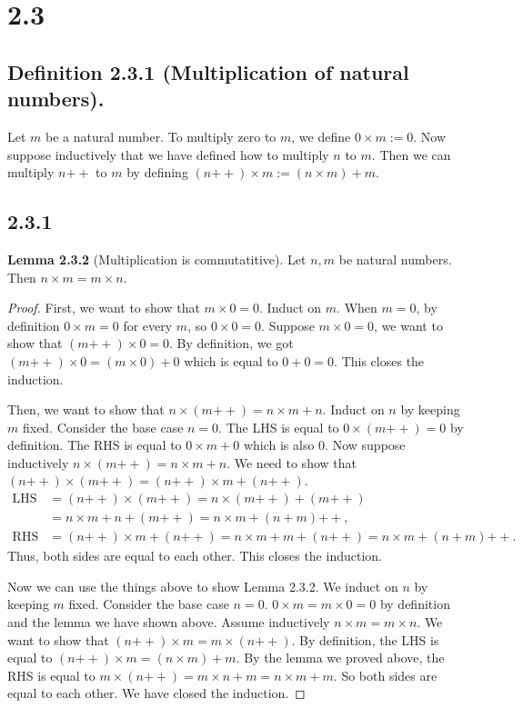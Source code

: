\documentclass[12pt, letter]{article}
\begin{document}
\section*{2.3}
\subsection*{Definition 2.3.1 (Multiplication of natural numbers).}
Let $m$ be a natural number. To multiply zero to $m$, we define $0\times m:=0$. Now suppose inductively that we have defined how to multiply $n$ to $m$. Then we can multiply $n\mathtt{++}$ to $m$ by defining $(n\mathtt{++})\times m:=(n\times m)+m$.
\subsection*{2.3.1}
\textbf{Lemma 2.3.2} (Multiplication is commutatitive). Let $n,m$ be natural numbers. Then $n\times m=m\times n$.
\begin{proof}
    First, we want to show that $m\times 0=0$. Induct on $m$. When $m=0$, by definition $0\times m=0$ for every $m$, so $0\times 0=0$. Suppose $m\times 0=0$, we want to show that $(m\mathtt{++})\times 0=0$. By definition, we got $(m\mathtt{++})\times 0=(m\times 0)+0$ which is equal to $0+0=0$. 
    This closes the induction.

    Then, we want to show that $n\times(m\mathtt{++})=n\times m+n$. Induct on $n$ by keeping $m$ fixed. Consider the base case $n=0$. The LHS is equal to $0\times(m\mathtt{++})=0$ by definition. The RHS is equal to 
    $0\times m+0$ which is also 0. Now suppose inductively $n\times (m\mathtt{++})=n\times m+n$. We need to show that $(n\mathtt{++})\times (m\mathtt{++})=(n\mathtt{++})\times m+(n\mathtt{++})$. 
    \begin{equation*}
        \begin{aligned}
            \text{LHS}&=(n\mathtt{++})\times(m\mathtt{++})=n\times (m\mathtt{++})+(m\mathtt{++})\\&=n\times m+n+(m\mathtt{++})=n\times m+(n+m)\mathtt{++},\\
            \text{RHS}&=(n\mathtt{++})\times m+(n\mathtt{++})=n\times m+m+(n\mathtt{++})=n\times m+(n+m)\mathtt{++}.
        \end{aligned}
    \end{equation*}
    Thus, both sides are equal to each other. This closes the induction.

    Now we can use the things above to show Lemma 2.3.2. We induct on $n$ by keeping $m$ fixed. Consider the base case $n=0$. $0\times m=m\times 0=0$ by definition and the lemma we have shown above. Assume inductively $n\times m = m\times n$. We want to show that 
    $(n\mathtt{++})\times m=m\times (n\mathtt{++})$. By definition, the LHS is equal to $(n\mathtt{++})\times m=(n\times m)+m$. By the lemma we proved above, the RHS is equal to $m\times(n\mathtt{++})=m\times n+m=n\times m+m$. So both sides are equal to each other. We have closed the induction.  
\end{proof}
\end{document}
